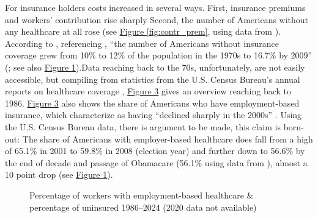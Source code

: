 \documentclass[11pt]{article}
\begin{document}
For insurance holders costs increased in several ways. First, insurance premiums and workers' contribution rise sharply Second, the number of Americans without any healthcare at all rose (see \hyperref[fig:contr_prem]{Figure \ref*{fig:contr_prem}}, using data from ). According to \textcite[][]{Jacobs2014}, referencing \textcite[][]{Starr2011}, \enquote{the number of Americans without insurance coverage grew from 10\% to 12\% of the population in the 1970s to 16.7\% by 2009} (; see also \hyperref[fig:emp_un]{Figure \ref*{fig:emp_un}}).Data reaching back to the 70s, unfortunately, are not easily accessible, but compiling from statistics from the U.S. Census Bureau's annual reports on healthcare coverage \parencites{Census2013}[see the supplemental matieral of][note that the methdology of these studies has been slightly adjusted over-time somewhat limiting comparability between the two study periods]{Census2024}, \hyperref[fig:emp_un]{Figure 3} gives an overview reaching back to 1986. \hyperref[fig:emp_un]{Figure 3} also shows the share of Americans who have employment-based insurance, which \textcite[][]{Jacobs2014} characterize as having \enquote{declined sharply in the 2000s} . Using the U.S. Census Bureau data, there is argument to be made, this claim is born-out: The share of Americans with employer-based healthcare does fall from a high of 65.1\% in 2001 to 59.8\% in 2008 (election year) and further down to 56.6\% by the end of decade and passage of Obamacare (56.1\% using data from ), almost a 10 point drop (see \hyperref[fig:emp_un]{Figure \ref*{fig:emp_un}}).

\begin{figure}[!ht]
  \sffamily
  \caption{Percentage of workers with employment-based healthcare \& percentage of uninsured 1986--2024 (2020 data not available)}
  
  \label{fig:emp_un}
\end{figure}
\end{document}
